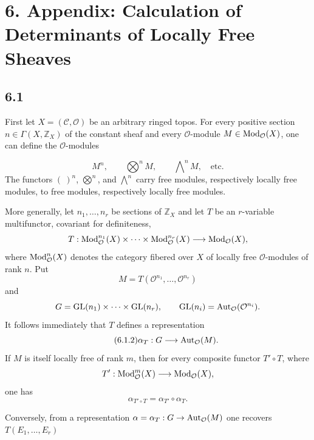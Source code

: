 \section*{6. Appendix: Calculation of Determinants of Locally Free Sheaves}

\subsection*{6.1}
First let $X=(\mathcal C,\mathcal O)$ be an arbitrary ringed topos. For every
positive section $n\in\Gamma(X,\mathbb Z_X)$ of the constant sheaf and every
$\mathcal O$-module $M\in\operatorname{Mod}_{\mathcal O}(X)$, one can define the
$\mathcal O$-modules

\begin{equation}\tag{6.1.1}
M^n,\qquad \bigotimes\nolimits^n M,\qquad
\bigwedge\nolimits^n M,\quad\text{etc.}
\end{equation}
The functors $(\ )^n$, $\bigotimes^n$, and $\bigwedge^n$ carry free modules,
respectively locally free modules, to free modules, respectively locally free
modules.

More generally, let $n_1,\ldots,n_r$ be sections of $\mathbb Z_X$ and let
$T$ be an $r$-variable multifunctor, covariant for definiteness,
\[
T:\operatorname{Mod}_{\mathcal O}^{n_1}(X)\times\cdots\times
\operatorname{Mod}_{\mathcal O}^{n_r}(X)\longrightarrow\operatorname{Mod}_{\mathcal O}(X),
\]
where $\operatorname{Mod}_{\mathcal O}^n(X)$ denotes the category fibered over $X$ of
locally free $\mathcal O$-modules of rank $n$. Put
\[
M=T(\mathcal O^{n_1},\ldots,\mathcal O^{n_r})
\]
and
\[
G=\operatorname{GL}(n_1)\times\cdots\times\operatorname{GL}(n_r),
\qquad
\operatorname{GL}(n_i)=\operatorname{Aut}_{\mathcal O}(\mathcal O^{n_i}).
\]
It follows immediately that $T$ defines a representation
\begin{equation}\tag{6.1.2}
\alpha_T:G\longrightarrow\operatorname{Aut}_{\mathcal O}(M).
\end{equation}
If $M$ is itself locally free of rank $m$, then for every composite functor
$T'\circ T$, where
\[
T':\operatorname{Mod}_{\mathcal O}^m(X)\longrightarrow\operatorname{Mod}_{\mathcal O}(X),
\]
one has
\begin{equation}\tag{6.1.3}
\alpha_{T'\circ T}=\alpha_{T'}\circ\alpha_T.
\end{equation}

Conversely, from a representation
$\alpha=\alpha_T:G\to\operatorname{Aut}_{\mathcal O}(M)$ one recovers
$T(E_1,\ldots,E_r)$

